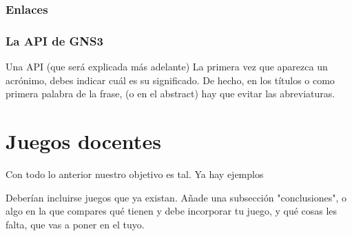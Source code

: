 \subsubsection{Enlaces}

\subsubsection{La API de GNS3}
Una API (que será explicada más adelante)
La primera vez que aparezca un acrónimo, debes indicar cuál es su significado. De hecho, en los títulos o como primera palabra de la frase, (o en el abstract) hay que evitar las abreviaturas.

\section{Juegos docentes}
Con todo lo anterior nuestro objetivo es tal. Ya hay ejemplos



Deberían incluirse juegos que ya existan. Añade una subsección "conclusiones", o algo en la que compares qué tienen y debe incorporar tu juego, y qué cosas les falta, que vas a poner en el tuyo.